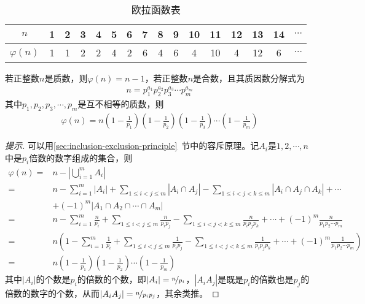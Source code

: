 \begin{table}[htbp]
  \centering
  \caption{欧拉函数表}
  \label{tab:Euler-function-values}
  \begin{tabular}{cccccccccccccccc}
    \toprule
    $n$          & 1 & 2 & 3 & 4 & 5 & 6 & 7 & 8 & 9 & 10 & 11 & 12 & 13 & 14 & $\cdots$\\\midrule
    $\varphi(n)$ & 1 & 1 & 2 & 2 & 4 & 2 & 6 & 4 & 6 & 4  & 10 & 4  & 12 & 6  & $\cdots$\\
    \bottomrule
  \end{tabular}
\end{table}

\begin{theorem}
  若正整数$n$是质数，则$\varphi(n)=n-1$，若正整数$n$是合数，且其质因数分解式为
  \begin{align*}
    n=p_1^{a_1} p_2^{a_2} p_3^{a_3} \cdots p_m^{a_m}
  \end{align*}
  其中$p_1,p_2,p_3,\cdots,p_m$是互不相等的质数，则
  \begin{align*}
    \varphi(n)=n\left(1-\frac1{p_1}\right) \left(1-\frac1{p_2}\right) \left(1-\frac1{p_3}\right) \cdots \left(1-\frac1{p_m}\right)
  \end{align*}
\end{theorem}
\begin{proof}[提示]可以用\ref{sec:inclusion-exclusion-principle}~节中的容斥原理。记$A_i$是$1,2,\cdots,n$中是$p_i$倍数的数字组成的集合，则
  {\small
  \begin{align*}
    \varphi(n) ={}& n - \left|\bigcup_{i=1}^m A_i\right| \\
    ={}& n - \sum_{i=1}^m\left|A_i\right|
         + \sum_{1\le i<j\le m}\left|A_i\cap A_j\right| - \sum_{1\le i<j<k\le m}\left|A_i\cap A_j\cap A_k\right| + \cdots\\
       & + (-1)^{m}\left|A_1\cap A_2\cap \cdots \cap A_m\right|\\
    ={}& n - \sum_{i=1}^m \frac{n}{p_i}
         + \sum_{1\le i<j\le m}\frac{n}{p_ip_j}
         - \sum_{1\le i<j<k\le m}\frac{n}{p_ip_jp_k} + \cdots
         + (-1)^{m}\frac{n}{p_1p_2\cdots p_m}\\
    ={}& n\left( 1 - \sum_{i=1}^m \frac{1}{p_i}
         + \sum_{1\le i<j\le m}\frac{1}{p_ip_j}
         - \sum_{1\le i<j<k\le m}\frac{1}{p_ip_jp_k} + \cdots
         + (-1)^{m}\frac{1}{p_1p_2\cdots p_m}\right)\\
    ={}& n\left(1-\frac1{p_1}\right) \left(1-\frac1{p_2}\right) \cdots \left(1-\frac1{p_m}\right)
  \end{align*}
  }
  其中$|A_i|$的个数是$p_i$的倍数的个数，即$|A_i| = \nicefrac{n}{p_i}$，$|A_iA_j|$是既是$p_i$的倍数也是$p_j$的倍数的数字的个数，从而$|A_iA_j| = \nicefrac{n}{p_ip_j}$，其余类推。
\end{proof}

